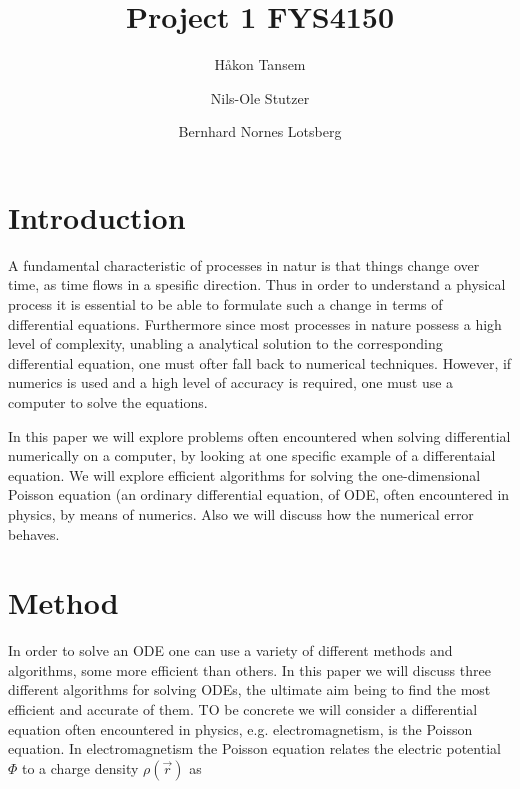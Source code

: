 \documentclass[twocolumn]{aastex62}
\begin{document}
\title{Project 1 FYS4150}




\author[0000-0002-0786-7307]{Håkon Tansem}

\author[0000-0002-0786-7307]{Nils-Ole Stutzer}

\author[0000-0002-0786-7307]{Bernhard Nornes Lotsberg}

\begin{abstract}

\end{abstract}

\section{Introduction} \label{sec:intro}
A fundamental characteristic of processes in natur is that things change over time, as time flows in a spesific direction. Thus in order to understand a physical process it is essential to be able to formulate such a change in terms of differential equations. Furthermore since most processes in nature possess a high level of complexity, unabling a analytical solution to the corresponding differential equation, one must ofter fall back to numerical techniques. However, if numerics is used and a high level of accuracy is required, one must use a computer to solve the equations.

In this paper we will explore problems often encountered when solving differential numerically on a computer, by looking at one specific example of a differentaial equation. We will explore efficient algorithms for solving the one-dimensional Poisson equation (an ordinary differential equation, of ODE, often encountered in physics, by means of numerics. Also we will discuss how the numerical error behaves.
 
\section{Method} \label{sec:method}
In order to solve an ODE one can use a variety of different methods and algorithms, some more efficient than others. In this paper we will discuss three different algorithms for solving ODEs, the ultimate aim being to find the most efficient and accurate of them. TO be concrete we will consider a differential equation often encountered in physics, e.g. electromagnetism, is the Poisson equation. In electromagnetism the Poisson equation relates the electric potential $\Phi$ to a charge density $\rho(\vec{r})$ as 
\end{document}
